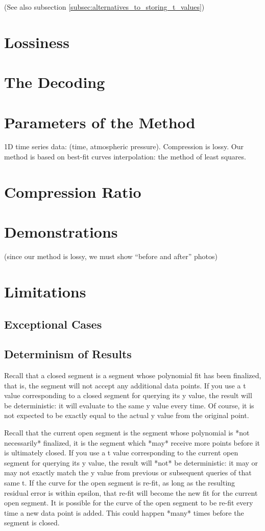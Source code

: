 \documentclass{article}
\begin{document}
(See also subsection \ref{subsec:alternatives_to_storing_t_values})


\section{Lossiness}

\section{The Decoding}

\section{Parameters of the Method}
1D time series data: (time, atmospheric pressure).
Compression is lossy.
Our method is based on best-fit curves interpolation: the method of least squares.

\section{Compression Ratio}

\section{Demonstrations}
(since our method is lossy, we must show “before and after” photos)

\section{Limitations}
\subsection{Exceptional Cases}

\subsection{Determinism of Results}
Recall that a closed segment is a segment whose polynomial fit has been finalized, that is, the segment will not accept any additional data points. If you use a t value corresponding to a closed segment for querying its y value, the result will be deterministic: it will evaluate to the same y value every time. Of course, it is not expected to be exactly equal to the actual y value from the original point.

Recall that the current open segment is the segment whose polynomial is *not necessarily* finalized, it is the segment which *may* receive more points before it is ultimately closed. If you use a t value corresponding to the current open segment for querying its y value, the result will *not* be deterministic: it may or may not exactly match the y value from previous or subsequent queries of that same t.
If the curve for the open segment is re-fit, as long as the resulting residual error is within epsilon, that re-fit will become the new fit for the current open segment. It is possible for the curve of the open segment to be re-fit every time a new data point is added. This could happen *many* times before the segment is closed.
\end{document}
